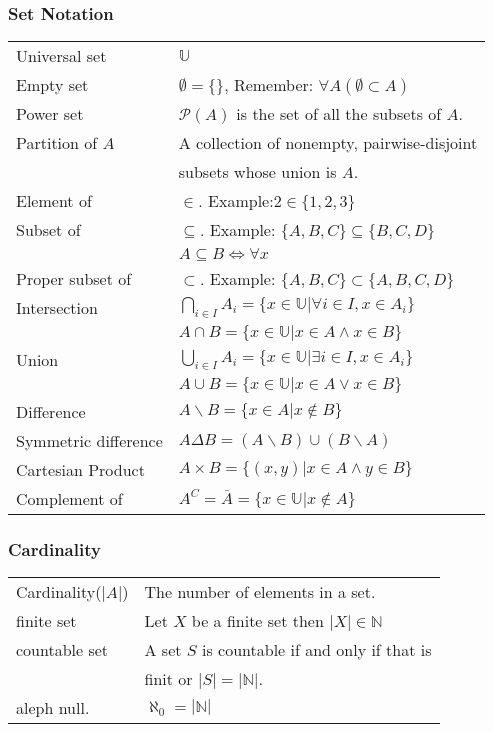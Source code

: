 \documentclass[5pt]{article}
\newcommand{\universalSet}{\mathbb{U}}
\begin{document}
\begin{multicols}{2}
\subsubsection{Set Notation}
\begin{tabular}{ll}
    Universal set           & $\universalSet$\\
    Empty set               & $\emptyset=\{\}$, Remember: $\forall A (\emptyset\subset A)$\\
    Power set               & $\mathcal{P}(A)$ is the set of all the subsets of $A$.\\
    Partition of $A$        & A collection of nonempty, \small{pairwise-disjoint}\\
                            & subsets whose union is $A$.\\
    Element of              & $\in$. Example:$2\in\{1,2,3\}$\\
    Subset of               & $\subseteq$. Example: $\{A, B,C\}\subseteq\{B,C,D\}$\\
                            & $A\subseteq B \Leftrightarrow\forall x$\\
    Proper subset of        & $\subset$. Example: $\{A, B,C\}\subset\{A, B,C,D\}$\\
    Intersection            & $\bigcap_{i\in I}A_i=\{x\in\universalSet|\forall i\in I, x\in A_i\}$\\
                            & $A\cap B=\{x\in\universalSet|x\in A\land x\in B\}$\\
    Union                   & $\bigcup_{i\in I}A_i=\{x\in\universalSet|\exists i\in I, x\in A_i\}$\\
                            & $A\cup B=\{x\in\universalSet|x\in A\lor x\in B\}$\\
    Difference              & $A\backslash B=\{x\in A|x\notin B\}$\\
    Symmetric difference    & $A\Delta B=(A\backslash B)\cup(B\backslash A)$\\
    Cartesian Product       & $A\times B=\{(x,y)|x\in A\land y \in B\}$\\
    Complement of           & $A^C=\bar{A}=\{x\in\universalSet|x\notin A\}$\\
\end{tabular}

\subsubsection{Cardinality}
\begin{tabular}{ll}
    Cardinality($|A|$)  & The number of elements in a set.\\
    finite set          & Let $X$ be a finite set then $|X|\in \mathbb{N}$\\
    countable set       & A set $S$ is countable if and only if that is\\
                        & finit or $|S|=|\mathbb{N}|$.\\
    aleph null.         & $\aleph_0=|\mathbb{N}|$\\
\end{tabular}


\end{multicols}
\end{document}
